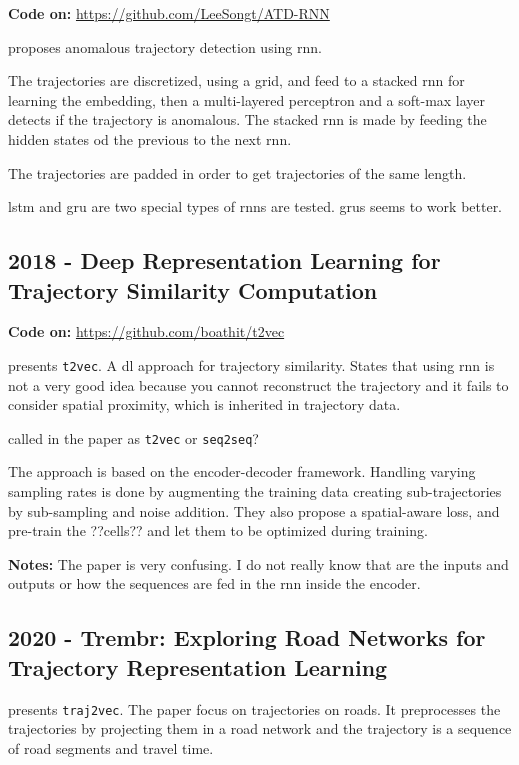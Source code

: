 \textbf{Code on:} \url{https://github.com/LeeSongt/ATD-RNN}

\cite{song2018anomalous} proposes anomalous trajectory detection using \gls{rnn}.

The trajectories are discretized, using a grid, and feed to a stacked \gls{rnn} for learning the embedding, then a multi-layered perceptron and a soft-max layer detects if the trajectory is anomalous.
%
The stacked \gls{rnn} is made by feeding the hidden states od the previous to the next \gls{rnn}.

The trajectories are padded in order to get trajectories of the same length.

\gls{lstm} and \gls{gru} are two special types of \glspl{rnn} are tested. \glspl{gru} seems to work better.

\subsection*{2018 - Deep Representation Learning for Trajectory Similarity Computation}

\textbf{Code on:} \url{https://github.com/boathit/t2vec}

\cite{li2018deep} presents \texttt{t2vec}. A \gls{dl} approach for trajectory similarity. States that using \gls{rnn} is not a very good idea because you cannot reconstruct the trajectory and it fails to consider spatial proximity, which is inherited in trajectory data.

called in the paper as \texttt{t2vec} or \texttt{seq2seq}?

The approach is based on the encoder-decoder framework.
%
Handling varying sampling rates is done by augmenting the training data creating sub-trajectories by sub-sampling and noise addition. They also propose a spatial-aware loss, and pre-train the ??cells?? and let them to be optimized during training.

\textbf{Notes:} The paper is very confusing. I do not really know that are the inputs and outputs or how the sequences are fed in the \gls{rnn} inside the encoder.


\subsection*{2020 - Trembr: Exploring Road Networks for Trajectory Representation Learning}

\cite{fu2020trembr} presents \texttt{traj2vec}. The paper focus on trajectories on roads. It preprocesses the trajectories by projecting them in a road network and the trajectory is a sequence of road segments and travel time.

